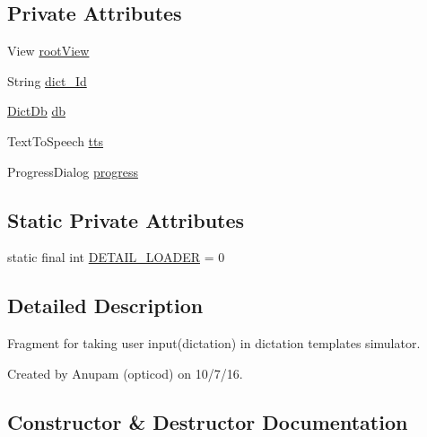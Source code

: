 \subsection*{Private Attributes}
\begin{DoxyCompactItemize}
\item 
View \hyperlink{classorg_1_1buildmlearn_1_1toolkit_1_1dictationtemplate_1_1fragment_1_1DetailActivityFragment_af4e345b3af7deeb12727648699ce12fb}{root\+View}
\item 
String \hyperlink{classorg_1_1buildmlearn_1_1toolkit_1_1dictationtemplate_1_1fragment_1_1DetailActivityFragment_a835cc1f7a7b937ee23b18541109d4c41}{dict\+\_\+\+Id}
\item 
\hyperlink{classorg_1_1buildmlearn_1_1toolkit_1_1dictationtemplate_1_1data_1_1DictDb}{Dict\+Db} \hyperlink{classorg_1_1buildmlearn_1_1toolkit_1_1dictationtemplate_1_1fragment_1_1DetailActivityFragment_a66745fb758ed723ff09e89f2bf2b4de4}{db}
\item 
Text\+To\+Speech \hyperlink{classorg_1_1buildmlearn_1_1toolkit_1_1dictationtemplate_1_1fragment_1_1DetailActivityFragment_af48d0b5c8abacce32ab36b327d15be60}{tts}
\item 
Progress\+Dialog \hyperlink{classorg_1_1buildmlearn_1_1toolkit_1_1dictationtemplate_1_1fragment_1_1DetailActivityFragment_aa6c24b1db797243726e4806dbf32d6bf}{progress}
\end{DoxyCompactItemize}
\subsection*{Static Private Attributes}
\begin{DoxyCompactItemize}
\item 
static final int \hyperlink{classorg_1_1buildmlearn_1_1toolkit_1_1dictationtemplate_1_1fragment_1_1DetailActivityFragment_a22520d9b3d0bda5b5c0fb321af08ffc9}{D\+E\+T\+A\+I\+L\+\_\+\+L\+O\+A\+D\+ER} = 0
\end{DoxyCompactItemize}


\subsection{Detailed Description}
Fragment for taking user input(dictation) in dictation template\textquotesingle{}s simulator. 

Created by Anupam (opticod) on 10/7/16. 

\subsection{Constructor \& Destructor Documentation}
